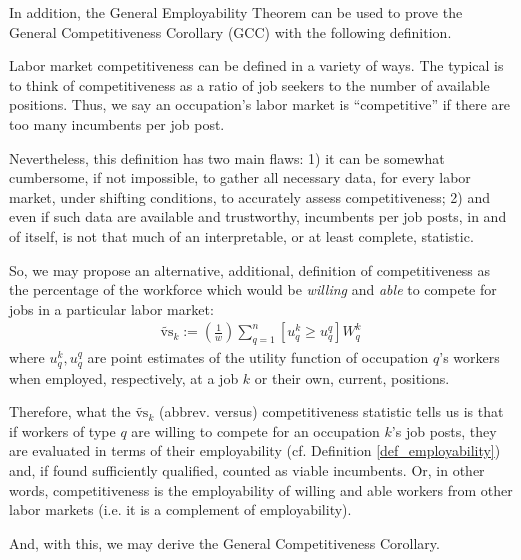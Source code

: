 \documentclass[hidelinks, nonatbib]{elsarticle}
\begin{document}
In addition, the General Employability Theorem can be used to prove the General Competitiveness Corollary (GCC) with the following definition.
\begin{definition}[Competitiveness]
    \label{def_competitiveness}
    Labor market competitiveness can be defined in a variety of ways. The typical is to think of competitiveness as a ratio of job seekers to the number of available positions. Thus, we say an occupation's labor market is ``competitive'' if there are too many incumbents per job post.
    
    Nevertheless, this definition has two main flaws: 1) it can be somewhat cumbersome, if not impossible, to gather all necessary data, for every labor market, under shifting conditions, to accurately assess competitiveness; 2) and even if such data are available and trustworthy, incumbents per job posts, in and of itself, is not that much of an interpretable, or at least complete, statistic.
    
    So, we may propose an alternative, additional, definition of competitiveness as the percentage of the workforce which would be \textit{willing} and \textit{able} to compete for jobs in a particular labor market:
    \begin{gather}
        \tilde{\text{vs}}_{k}
        :=
        \left(
            \frac{1}{w}
        \right)
        \sum_{q=1}^{n}
        \left[
            u_{q}^{k}
            \geq
            u_{q}^{q}
        \right]
        W_{q}^{k}
    \end{gather}
    where $u_{q}^{k}, u_{q}^{q}$ are point estimates of the utility function of occupation $q$'s workers when employed, respectively, at a job $k$ or their own, current, positions.
    
    Therefore, what the $\tilde{\text{vs}}_{k}$ (abbrev. versus) competitiveness statistic tells us is that if workers of type $q$ are willing to compete for an occupation $k$'s job posts, they are evaluated in terms of their employability (cf. Definition \ref{def_employability}) and, if found sufficiently qualified, counted as viable incumbents. Or, in other words, competitiveness is the employability of willing and able workers from other labor markets (i.e. it is a complement of employability).
\end{definition}
And, with this, we may derive the General Competitiveness Corollary.
\end{document}
